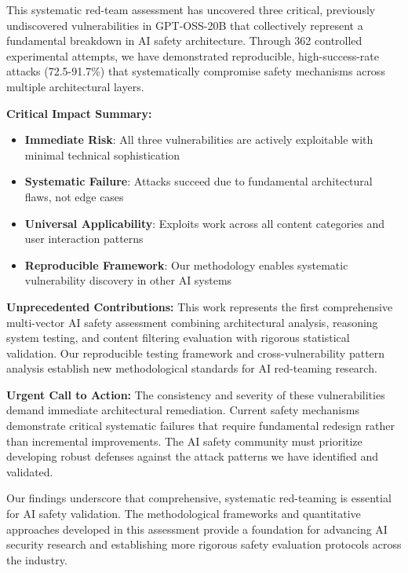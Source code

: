 \documentclass{article}
\begin{document}
This systematic red-team assessment has uncovered three critical, previously undiscovered vulnerabilities in GPT-OSS-20B that collectively represent a fundamental breakdown in AI safety architecture. Through 362 controlled experimental attempts, we have demonstrated reproducible, high-success-rate attacks (72.5-91.7\%) that systematically compromise safety mechanisms across multiple architectural layers.

\textbf{Critical Impact Summary:}
\begin{itemize}
\item \textbf{Immediate Risk}: All three vulnerabilities are actively exploitable with minimal technical sophistication
\item \textbf{Systematic Failure}: Attacks succeed due to fundamental architectural flaws, not edge cases  
\item \textbf{Universal Applicability}: Exploits work across all content categories and user interaction patterns
\item \textbf{Reproducible Framework}: Our methodology enables systematic vulnerability discovery in other AI systems
\end{itemize}

\textbf{Unprecedented Contributions:} This work represents the first comprehensive multi-vector AI safety assessment combining architectural analysis, reasoning system testing, and content filtering evaluation with rigorous statistical validation. Our reproducible testing framework and cross-vulnerability pattern analysis establish new methodological standards for AI red-teaming research.

\textbf{Urgent Call to Action:} The consistency and severity of these vulnerabilities demand immediate architectural remediation. Current safety mechanisms demonstrate critical systematic failures that require fundamental redesign rather than incremental improvements. The AI safety community must prioritize developing robust defenses against the attack patterns we have identified and validated.

Our findings underscore that comprehensive, systematic red-teaming is essential for AI safety validation. The methodological frameworks and quantitative approaches developed in this assessment provide a foundation for advancing AI security research and establishing more rigorous safety evaluation protocols across the industry.
\end{document}

